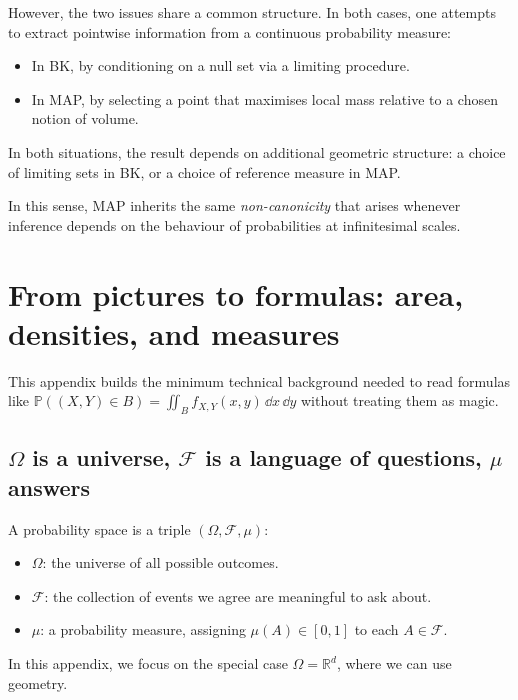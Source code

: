 \documentclass[11pt]{article}
\theoremstyle{remark}
\begin{document}
However, the two issues share a common structure. In both cases, one attempts
to extract pointwise information from a continuous probability measure:
\begin{itemize}
\item In BK, by conditioning on a null set via a limiting procedure.
\item In MAP, by selecting a point that maximises local mass relative to a
      chosen notion of volume.
\end{itemize}
In both situations, the result depends on additional geometric structure:
a choice of limiting sets in BK, or a choice of reference measure in MAP.

In this sense, MAP inherits the same \emph{non-canonicity} that arises whenever
inference depends on the behaviour of probabilities at infinitesimal scales.




\appendix

\section{From pictures to formulas: area, densities, and measures}
\label{app:density_measures}

This appendix builds the minimum technical background needed to read formulas like
\(\mathbb{P}((X,Y)\in B)=\iint_B f_{X,Y}(x,y)\,\dd x\,\dd y\) without treating them as magic.

\subsection{\(\Omega\) is a universe, \(\mathcal{F}\) is a language of questions, \(\mu\) answers}
A probability space is a triple \((\Omega,\mathcal{F},\mu)\):
\begin{itemize}
\item \(\Omega\): the universe of all possible outcomes.
\item \(\mathcal{F}\): the collection of events we agree are meaningful to ask about.
\item \(\mu\): a probability measure, assigning \(\mu(A)\in[0,1]\) to each \(A\in\mathcal{F}\).
\end{itemize}
In this appendix, we focus on the special case \(\Omega=\mathbb{R}^d\), where we can use geometry.
\end{document}
